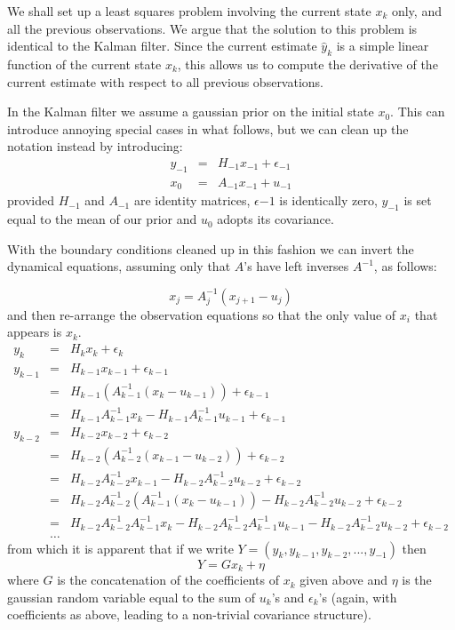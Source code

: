 \documentclass[a4paper,11pt]{article}
\begin{document}
We shall set up a least squares problem involving the current state $x_k$ only, and all the previous observations. We argue that the solution to this problem is identical to the Kalman filter. Since the current estimate $\hat{y}_k$ is a simple linear function of the current state $x_k$, this allows us to compute the derivative of the current estimate with respect to all previous observations.

In the Kalman filter we assume a gaussian prior on the initial state $x_0$. This can introduce annoying special cases in what follows, but we can clean up the notation instead by introducing: \begin{eqnarray}    y_{-1} & = & H_{-1} x_{-1} + \epsilon_{-1} \\ x_0 & = & A_{-1} x_{-1} + u_{-1} \end{eqnarray} provided $H_{-1}$ and $A_{-1}$ are identity matrices, $\epsilon{-1}$ is identically zero, $y_{-1}$ is set equal to the mean of our prior and $u_0$ adopts its covariance. 

With the boundary conditions cleaned up in this fashion we can invert the dynamical equations, assuming only that $A$'s have left inverses $A^{-1}$, as follows: 

\begin{equation} x_j = A^{-1}_{j}\left( x_{j+1} - u_j \right) 
\end{equation} and then re-arrange the observation equations so that the only value of $x_i$ that appears is $x_k$. 
\begin{eqnarray} 
   y_k & = & H_k x_{k} + \epsilon_k \\ y_{k-1} & = & H_{k-1} x_{k-1} + \epsilon_{k-1} \\ & = & H_{k-1} \left( A^{-1}_{k-1}\left( x_{k} - u_{k-1} \right) \right) + \epsilon_{k-1} \\ & = & H_{k-1} A^{-1}_{k-1} x_{k} - H_{k-1} A^{-1}_{k-1} u_{k-1} + \epsilon_{k-1} \\ y_{k-2} & = & H_{k-2} x_{k-2} + \epsilon_{k-2} \\ 
 & = & H_{k-2} \left( A^{-1}_{k-2}\left( x_{k-1} - u_{k-2} \right) \right) + \epsilon_{k-2} \\ & = & H_{k-2} A^{-1}_{k-2} x_{k-1} - H_{k-2} A^{-1}_{k-2} u_{k-2} + \epsilon_{k-2} \\ 
 & = & H_{k-2} A^{-1}_{k-2} \left( A^{-1}_{k-1}\left( x_{k} - u_{k-1} \right) \right) - H_{k-2} A^{-1}_{k-2} u_{k-2} + \epsilon_{k-2} \\     
 & = & H_{k-2} A^{-1}_{k-2} A^{-1}_{k-1} x_{k} - H_{k-2} A^{-1}_{k-2} A^{-1}_{k-1} u_{k-1} - H_{k-2} A^{-1}_{k-2} u_{k-2} + \epsilon_{k-2} \\ & \dots & 
 \end{eqnarray} from which it is apparent that if we write $Y = (y_k, y_{k-1}, y_{k-2},...,y_{-1} ) $ then \begin{equation} Y = G x_{k} + \eta \end{equation} where $G$ is the concatenation of the coefficients of $x_k$ given above and $\eta$ is the gaussian random variable equal to the sum of $u_k$'s and $\epsilon_k$'s (again, with coefficients as above, leading to a non-trivial covariance structure).
\end{document}

